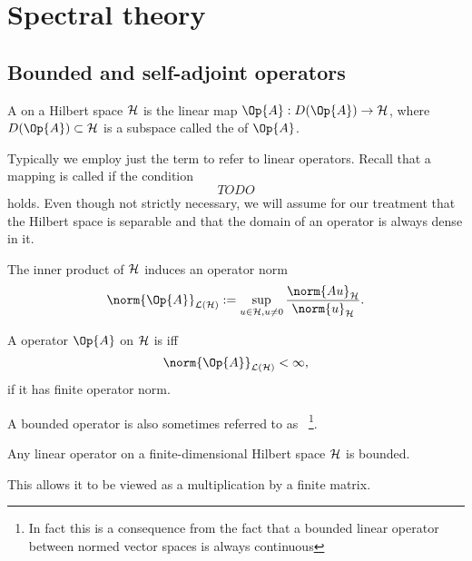 \section{Spectral theory}

\subsection{Bounded and self-adjoint operators}

\begin{defn}
	A  on a Hilbert space $\mathcal{H}$
	is the linear map $\Op{A} : D(\Op{A}) \to \hilbert$,
	where $D(\Op{A}) \subset \hilbert$ is a subspace
	called the  of $\Op{A}$.
\end{defn}
Typically we employ just the term  to refer to linear operators.
Recall that a mapping is called  if the condition
\[ TODO \]
holds.
Even though not strictly necessary, we will assume for our treatment
that the Hilbert space is separable and that the domain of an operator
is always dense in it.

\newcommand{\opnorm}[1]{\norm{#1}_{\mathcal{L}(\hilbert)}}
\begin{defn}
	The inner product of $\mathcal{H}$ induces an operator norm
	\[ \opnorm{\Op{A}} := \sup_{u \in \hilbert, u\neq0} \frac{\norm{A u}_\hilbert}{\norm{u}_{\hilbert}}. \]
\end{defn}

\begin{defn}
	A operator $\Op{A}$ on $\mathcal{H}$ is  iff
	\[ \opnorm{\Op{A}} < \infty, \]
	\ie if it has finite operator norm.
\end{defn}
A bounded operator is also sometimes referred to as %
~\footnote{In fact this is a consequence from the fact that a bounded linear operator
between normed vector spaces is always continuous}.

\begin{prop}
	Any linear operator on a finite-dimensional Hilbert space $\mathcal{H}$ is bounded.
\end{prop}
This allows it to be viewed as a multiplication by a finite matrix.

